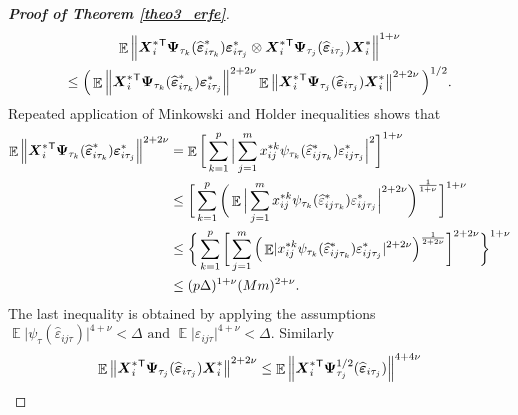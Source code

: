 \documentclass[15pt,a4paper]{article}
\DeclareMathOperator{\E}{\mathbb{E}}
\newcommand{\norm}[1]{\left\lVert#1\right\rVert}
\newcommand{\transpose}{{}^{\text{\sffamily T}}}
\begin{document}
\begin{proof}[\textbf{Proof of Theorem \ref{theo3_erfe}}]
\begin{multline*}
\E\norm{\boldsymbol{X}^{*}_i\transpose\boldsymbol{\Psi}_{\tau_k}(\widehat{\boldsymbol{\varepsilon}}^{*}_{i\tau_k})
\boldsymbol{\varepsilon}^{*}_{i\tau_j} \otimes\boldsymbol{X}^{*}_i\transpose \boldsymbol{\Psi}_{\tau_j}(\widehat{\boldsymbol{\varepsilon}}_{i\tau_j})\boldsymbol{X}^{*}_i }^{1+\nu} \\ 
\leq \Big(\E\norm{\boldsymbol{X}^{*}_i\transpose\boldsymbol{\Psi}_{\tau_k}(\widehat{\boldsymbol{\varepsilon}}^{*}_{i\tau_k})
\boldsymbol{\varepsilon}^{*}_{i\tau_j} }^{2+2\nu} \E\norm{\boldsymbol{X}^{*}_i\transpose \boldsymbol{\Psi}_{\tau_j}(\widehat{\boldsymbol{\varepsilon}}_{i\tau_j})\boldsymbol{X}^{*}_i }^{2+2\nu} \Big)^{1/2}.
\end{multline*}
Repeated application of Minkowski and Holder inequalities shows that 
\begin{equation*}
\begin{split}
\E\norm{ \boldsymbol{X}^{*}_i\transpose\boldsymbol{\Psi}_{\tau_k}(\widehat{\boldsymbol{\varepsilon}}^{*}_{i\tau_k}) \boldsymbol{\varepsilon}^{*}_{i\tau_j} }^{2+2\nu} 
&=\E\bigg[\sum_{k=1}^{p}\Big\lvert\sum_{j=1}^{m}x_{ij}^{*k}\psi_{\tau_k}(\widehat{\varepsilon}^{*}_{ij\tau_k})\varepsilon^{*}_{ij\tau_j}\Big\rvert^{2}\bigg]^{1+\nu}\\
& \leq \bigg[\sum_{k=1}^{p}\bigg( \E\Big\lvert\sum_{j=1}^{m}x_{ij}^{*k}\psi_{\tau_k}(\widehat{\varepsilon}^{*}_{ij\tau_k})\varepsilon^{*}_{ij\tau_j}
\Big\rvert^{2+2\nu}\bigg)^{\frac{1}{1+\nu}}
\bigg]^{1+\nu}\\
& \leq \bigg\lbrace  \sum_{k=1}^{p}\bigg[\sum_{j=1}^{m} \Big(\E\lvert x_{ij}^{*k}\psi_{\tau_k}(\widehat{\varepsilon}^{*}_{ij\tau_k})\varepsilon^{*}_{ij\tau_j} \rvert^{2+2\nu}\Big)^{\frac{1}{2+2\nu}} \bigg]^{2+2\nu} \bigg\rbrace^{1+\nu} \\
& \leq (p\Delta)^{1+\nu}(Mm)^{2+\nu}.
\end{split}
\end{equation*}
The last inequality is obtained by applying the assumptions $\E\lvert\psi_{\tau}(\widehat{\varepsilon}_{ij\tau}) \rvert^{4+\nu} < \Delta \mbox{ and } \E\lvert \varepsilon_{ij\tau}\rvert^{4 + \nu} < \Delta.$ Similarly
\begin{equation*}
\begin{split}
\E\norm{\boldsymbol{X}^{*}_i\transpose \boldsymbol{\Psi}_{\tau_j}(\widehat{\boldsymbol{\varepsilon}}_{i\tau_j})\boldsymbol{X}^{*}_i }^{2+2\nu}  
& \leq \E\norm{\boldsymbol{X}^{*}_i\transpose \boldsymbol{\Psi}_{\tau_j}^{1/2}(\widehat{\boldsymbol{\varepsilon}}_{i\tau_j}) }^{4+4\nu} \\

\end{split}
\end{equation*}
\end{proof}
\end{document}
